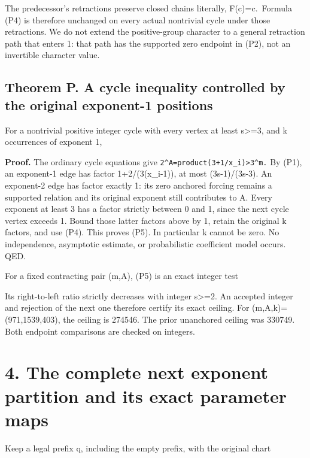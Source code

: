 The predecessor's retractions preserve closed chains literally,
F(c)=c.~Formula (P4) is therefore unchanged on every actual nontrivial
cycle under those retractions. We do not extend the positive-group
character to a general retraction path that enters 1: that path has the
supported zero endpoint in (P2), not an invertible character value.

\subsection{Theorem P. A cycle inequality controlled by the original
exponent-1 positions}

For a nontrivial positive integer cycle with every vertex at least
s\textgreater=3, and k occurrences of exponent 1,


\textbf{Proof.} The ordinary cycle equations give
\nolinkurl{2^A=product(3+1/x_i)>3^m.} By (P1), an exponent-1 edge has
factor 1+2/(3(x\_i-1)), at most (3s-1)/(3s-3). An exponent-2 edge has
factor exactly 1: its zero anchored forcing remains a supported relation
and its original exponent still contributes to A. Every exponent at
least 3 has a factor strictly between 0 and 1, since the next cycle
vertex exceeds 1. Bound those latter factors above by 1, retain the
original k factors, and use (P4). This proves (P5). In particular k
cannot be zero. No independence, asymptotic estimate, or probabilistic
coefficient model occurs. QED.

For a fixed contracting pair (m,A), (P5) is an exact integer test


Its right-to-left ratio strictly decreases with integer s\textgreater=2.
An accepted integer and rejection of the next one therefore certify its
exact ceiling. For (m,A,k)=(971,1539,403), the ceiling is 274546. The
prior unanchored ceiling was 330749. Both endpoint comparisons are
checked on integers.

\section{4. The complete next exponent partition and its exact parameter
maps}

Keep a legal prefix q, including the empty prefix, with the original
chart


